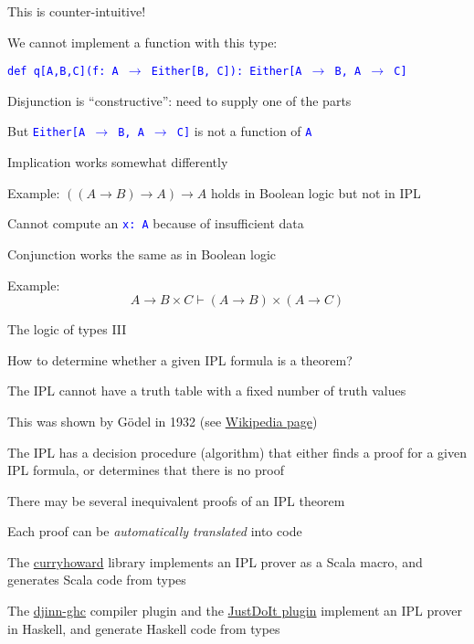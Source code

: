 This is counter-intuitive!

We cannot implement a function with this type:

\texttt{\textcolor{blue}{\footnotesize{}def q{[}A,B,C{]}(f: A $\rightarrow$
Either{[}B, C{]}): Either{[}A $\rightarrow$ B, A $\rightarrow$ C{]}}}{\footnotesize\par}

Disjunction is \textsf{``}constructive\textsf{''}: need to supply one of the parts

But \texttt{\textcolor{blue}{\footnotesize{}Either{[}A $\rightarrow$
B, A $\rightarrow$ C{]}}} is not a function of \texttt{\textcolor{blue}{\footnotesize{}A}} 

Implication works somewhat differently

Example: $\left(\left(A\rightarrow B\right)\rightarrow A\right)\rightarrow A$
holds in Boolean logic but not in IPL

Cannot compute an \texttt{\textcolor{blue}{\footnotesize{}x:\ A}}
because of insufficient data

Conjunction works the same as in Boolean logic

Example: 
\[
A\rightarrow B\times C\vdash\left(A\rightarrow B\right)\times\left(A\rightarrow C\right)
\]
 

The logic of types III

How to determine whether a given IPL formula is a theorem?

The IPL cannot have a truth table with a fixed number of truth values

This was shown by G\"odel in 1932 (see \href{https://en.wikipedia.org/wiki/Many-valued_logic}{Wikipedia page})

The IPL has a decision procedure (algorithm) that either finds a proof
for a given IPL formula, or determines that there is no proof

There may be several inequivalent proofs of an IPL theorem

Each proof can be \emph{automatically translated} into code

The \href{https://github.com/Chymyst/curryhoward}{curryhoward} library
implements an IPL prover as a Scala macro, and generates Scala code
from types

The \href{https://hackage.haskell.org/package/djinn-ghc}{djinn-ghc}
compiler plugin and the \href{https://github.com/nomeata/ghc-justdoit}{JustDoIt plugin}
implement an IPL prover in Haskell, and generate Haskell code from
types

